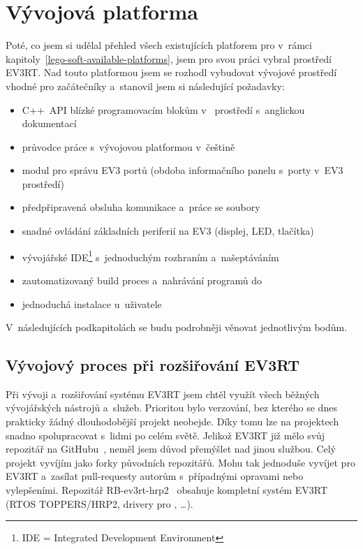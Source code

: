 \chapter{Vývojová platforma}

Poté, co jsem si udělal přehled všech existujících platforem pro \legoEV{} v~rámci kapitoly~\ref{lego-soft-available-platforms}, jsem pro svou práci vybral prostředí EV3RT.
Nad touto platformou jsem se rozhodl vybudovat  vývojové prostředí vhodné pro začátečníky a~stanovil jsem si následující požadavky:

\begin{itemize}
\item C++~API blízké programovacím blokům v~\lego{} prostředí s~anglickou dokumentací
\item průvodce práce s~vývojovou platformou v~češtině
\item modul pro správu EV3 portů (obdoba informačního panelu s~porty v~EV3 prostředí)  
\item předpřipravená obsluha komunikace a~práce se soubory
\item snadné ovládání základních periferií na EV3 (displej, LED, tlačítka)
\item vývojářské IDE\footnote{IDE = Integrated Development Environment} s~jednoduchým rozhraním a~našeptáváním 
\item zautomatizovaný build proces a~nahrávání programů do 
\item jednoduchá instalace u~uživatele
\end{itemize}
V~následujících podkapitolách se budu podrobněji věnovat jednotlivým bodům.


\section{Vývojový proces při rozšiřování EV3RT}

Při vývoji a~rozšiřování systému EV3RT jsem chtěl využít všech běžných vývojářských nástrojů a~služeb.
Prioritou bylo verzování, bez kterého se dnes prakticky žádný dlouhodobější projekt neobejde. Díky tomu lze na projektech snadno spolupracovat s~lidmi po celém světě.
Jelikož EV3RT již mělo svůj repozitář na GitHubu~\cite{legoProgramingPlatform_EV3RT-github}, neměl jsem důvod přemýšlet nad jinou službou.
Celý projekt vyvíjím jako forky původních repozitářů. Mohu tak jednoduše vyvíjet pro EV3RT a~zasílat pull-requesty autorům s~případnými opravami nebo vylepšeními.
Repozitář RB-ev3rt-hrp2~\cite{RB-ev3rt-hrp2-github} obsahuje kompletní systém EV3RT (RTOS TOPPERS/HRP2, drivery pro \brick{}, \dots). 

